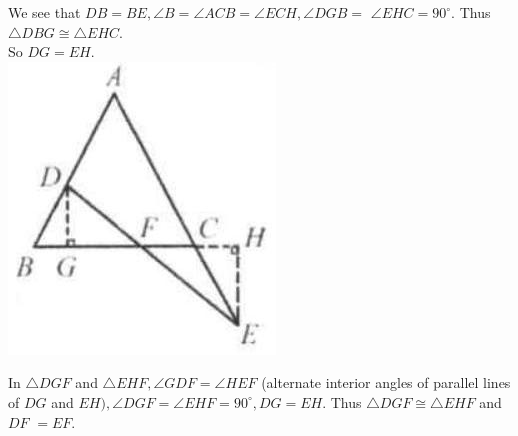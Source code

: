 \documentclass{article}
\begin{document}
We see that \(D B=B E, \angle B=\angle A C B=\angle E C H, \angle D G B=\) \(\angle E H C=90^{\circ}\). Thus \(\triangle D B G \cong \triangle E H C\).\\
So \(D G=E H\).\\
\centering
\includegraphics[width=\textwidth]{images/084(1).jpg}


In \(\triangle D G F\) and \(\triangle E H F, \angle G D F=\angle H E F\) (alternate interior angles of parallel lines of \(D G\) and \(E H), \angle D G F=\angle E H F=90^{\circ}, D G=E H\). Thus \(\triangle D G F \cong \triangle E H F\) and \(D F\) \(=E F\).
\end{document}
